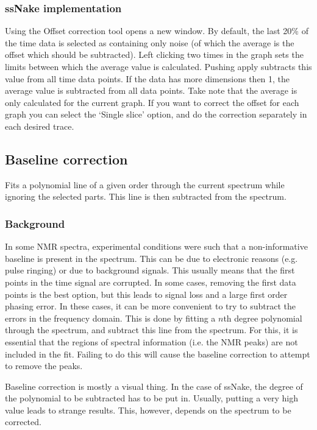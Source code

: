 \documentclass[11pt,a4paper]{article}
\begin{document}
\subsubsection*{ssNake implementation}
Using the Offset correction tool opens a new window. By default, the last 20\% of the time data is selected as containing only noise (of which the average is the offset which should be subtracted). Left clicking two times in the graph sets the limits between which the average value is calculated. Pushing apply subtracts this value from all time data points. If the data has more dimensions then 1, the average value is subtracted from all data points. Take note that the average is only calculated for the current graph. If you want to correct the offset for each graph you can select the `Single slice' option, and do the correction separately in each desired trace.

\subsection{Baseline correction}
Fits a polynomial line of a given order through the current spectrum while ignoring the selected parts. This line is then subtracted from the spectrum.

\subsubsection*{Background}
In some NMR spectra, experimental conditions were such that a non-informative baseline is present in the spectrum. This can be due to electronic reasons (e.g. pulse ringing) or due to background signals. This usually means that the first points in the time signal are corrupted. In some cases, removing the first data points is the best option, but this leads to signal loss and a large first order phasing error. In these cases, it can be more convenient to try to subtract the errors in the frequency domain. This is done by fitting a $n$th degree polynomial through  the spectrum, and subtract this line from the spectrum. For this, it is essential that the regions of spectral information (i.e. the NMR peaks) are not included in the fit. Failing to do this will cause the baseline correction to attempt to remove the peaks. 

Baseline correction is mostly a visual thing. In the case of ssNake, the degree of the polynomial to be subtracted has to be put in. Usually, putting a very high value leads to strange results. This, however, depends on the spectrum to be corrected.
\end{document}
